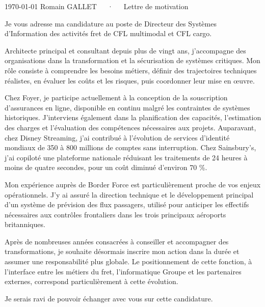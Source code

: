 \documentclass[11pt, a4paper]{awesome-cv}
\begin{document}
    \makecvheader[R]

    \makecvfooter
    {\today}
    {Romain GALLET~~~·~~~Lettre de motivation}
    {}

    \makelettertitle

    \begin{cvletter}

        Je vous adresse ma candidature au poste de Directeur des Systèmes d’Information des activités fret de CFL multimodal et CFL cargo.

        Architecte principal et consultant depuis plus de vingt ans, j’accompagne des organisations dans la transformation et la sécurisation de systèmes critiques. Mon rôle consiste à comprendre les besoins métiers, définir des trajectoires techniques réalistes,
        en évaluer les coûts et les risques, puis coordonner leur mise en œuvre.

        Chez Foyer, je participe actuellement à la conception de la souscription d’assurances en ligne, disponible en continu malgré les contraintes de systèmes historiques. J’interviens également dans la planification des capacités, l’estimation des charges
        et l’évaluation des compétences nécessaires aux projets. Auparavant, chez Disney Streaming, j’ai contribué à l’évolution de services d’identité mondiaux de 350 à 800 millions de comptes sans interruption.
        Chez Sainsbury’s, j’ai copiloté une plateforme nationale réduisant les traitements de 24 heures à moins de quatre secondes, pour un coût diminué d’environ 70 \%.

        Mon expérience auprès de Border Force est particulièrement proche de vos enjeux opérationnels. J’y ai assuré la direction technique et le développement principal d’un système de prévision des flux passagers, utilisé pour anticiper les effectifs nécessaires
        aux contrôles frontaliers dans les trois principaux aéroports britanniques.

        Après de nombreuses années consacrées à conseiller et accompagner des transformations, je souhaite désormais inscrire mon action dans la durée et assumer une responsabilité plus globale. Le positionnement de cette fonction,
        à l’interface entre les métiers du fret, l’informatique Groupe et les partenaires externes, correspond particulièrement à cette évolution.

        Je serais ravi de pouvoir échanger avec vous sur cette candidature.


    \end{cvletter}


    \makeletterclosing
\end{document}
